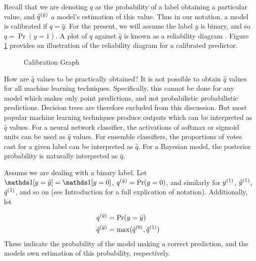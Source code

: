Recall that we are denoting $q$ as the probability of a label obtaining a particular value, and $\hat{q}^{(\hat{y})}$ a model's estimation of this value. Thus in our notation, a model is calibrated if $q=\hat{q}$. For the present, we will assume the label $y$ is binary, and so $q=\Pr(y=1)$. A plot of $q$ against $\hat{q}$ is known as a reliability diagram \cite{calibrating}. Figure \ref{fig:calibration} provides an illustration of the reliability diagram for a calibrated predictor.

\newcommand{\calibrationgraph}[7][]{
    \draw [thick, <->] (0,1.25) -- (0,0) -- (1.25,0);
    \node [below] at (1.25,0) {$\hat{q}$};
    14
    \node [left] at (0,1.25) {$q$};
    \node [left] at (0,#7) {$\Pr(y_t=\hat{y}_t)$};
    \node [below] at (#6,0) {$\hat{q}_t$};
    \draw (#2,#3) -- (#4,#5);
    \draw [red] (#6,0) -- (#6,#7);
    \draw [red, dashed] (0,#7) -- (#6,#7);
}

\begin{figure}
    \centering
    \caption{Calibration Graph}
    \label{fig:calibration}
\end{figure}

How are $\hat{q}$ values to be practically obtained? It is not possible to obtain $\hat{q}$ values for all machine learning techniques. Specifically, this cannot be done for any model which makes only point predictions, and not probabilistic probabilistic predictions. Decision trees are therefore excluded from this discussion. But most popular machine learning techniques produce outputs which can be interpreted as $\hat{q}$ values. For a neural network classifier, the activations of softmax or sigmoid units can be used as $\hat{q}$ values. For ensemble classifiers, the proportions of votes cast for a given label can be interpreted as $\hat{q}$. For a Bayesian model, the posterior probability is naturally interpreted as $\hat{q}$.

Assume we are dealing with a binary label. Let $\id{y=\hat{y}}=\id{y=0}$, $q^{(\hat{y})}=\Pr(y=0)$, and similarly for $y^{(1)}$, $\hat{y}^{(1)}$, $\hat{q}^{(1)}$, and so on (see Introduction for a full explication of notation). Additionally, let

\begin{align}
    q^{(\hat{y})} &= \Pr(y=\hat{y}) \\
    \hat{q}^{(\hat{y})} &= \max(\hat{q}^{(0)},\hat{q}^{(1)})
\end{align}
These indicate the probability of the model making a correct prediction, and the models own estimation of this probability, respectively. 


